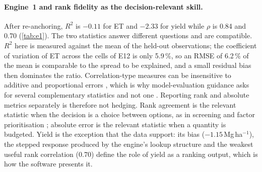 \paragraph{Engine~1 and rank fidelity as the decision-relevant skill.} After re-anchoring, $R^2$ is $-0.11$ for ET and $-2.33$ for yield while $\rho$ is 0.84 and 0.70 (\cref{tab:e1}). The two statistics answer different questions and are compatible. $R^2$ here is measured against the mean of the held-out observations; the coefficient of variation of ET across the cells of E12 is only 5.9\,\%, so an RMSE of 6.2\,\% of the mean is comparable to the spread to be explained, and a small residual bias then dominates the ratio. Correlation-type measures can be insensitive to additive and proportional errors \citep{Legates1999}, which is why model-evaluation guidance asks for several complementary statistics and not one \citep{Moriasi2007,Bennett2013}. Reporting rank and absolute metrics separately is therefore not hedging. Rank agreement is the relevant statistic when the decision is a choice between options, as in screening and factor prioritisation \citep{Saltelli2008}; absolute error is the relevant statistic when a quantity is budgeted. Yield is the exception that the data support: its bias ($-1.15$\,Mg\,ha$^{-1}$), the stepped response produced by the engine's lookup structure and the weakest useful rank correlation (0.70) define the role of yield as a ranking output, which is how the software presents it.

